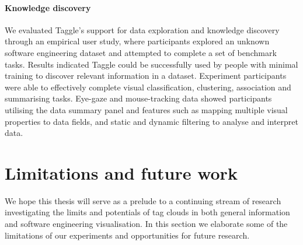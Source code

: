 \paragraph{Knowledge discovery} We evaluated Taggle's support for data exploration and knowledge discovery through an empirical user study, where participants explored an unknown software engineering dataset and attempted to complete a set of benchmark tasks. Results indicated Taggle could be successfully used by people with minimal training to discover relevant information in a dataset. Experiment participants were able to effectively complete visual classification, clustering, association and summarising tasks. Eye-gaze and mouse-tracking data showed participants utilising the data summary panel and features such as mapping multiple visual properties to data fields, and static and dynamic filtering to analyse and interpret data.  

\section{Limitations and future work}

We hope this thesis will serve as a prelude to a continuing stream of research investigating the limits and potentials of tag clouds in both general information and software engineering visualisation. In this section we elaborate some of the limitations of our experiments and opportunities for future research. 

